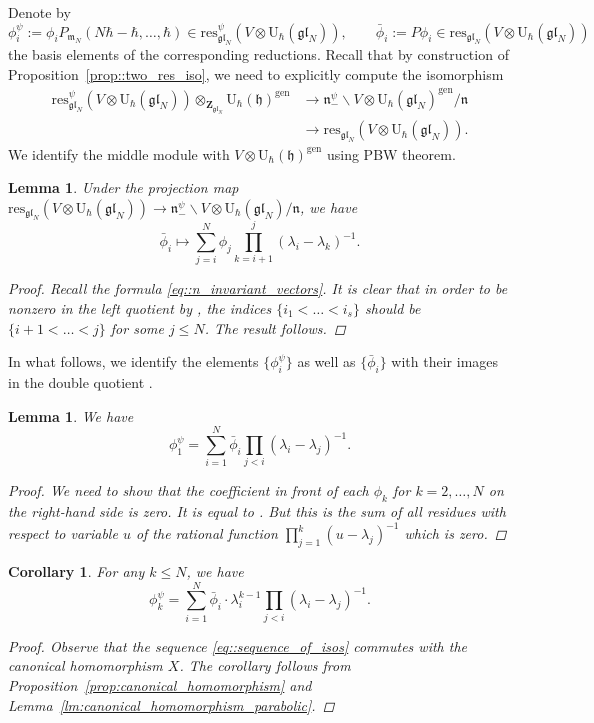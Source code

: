 \documentclass[10pt,a4paper]{article}
\numberwithin{equation}{section}
\newtheorem{Corollary}[Theorem]{Corollary}
\newtheorem{Lemma}[Theorem]{Lemma}
\newcommand{\U}{\mathrm{U}_{\hbar}}
\newcommand{\Z}{\mathbf{Z}}
\newcommand{\h}{\mathfrak{h}}
\newcommand{\n}{\mathfrak{n}}
\newcommand{\m}{\mathfrak{m}}
\newcommand{\gen}{\mathrm{gen}}
\newcommand{\res}{\mathrm{res}}
\newcommand{\gl}{\mathfrak{gl}}
\begin{document}
	Denote by
	\[
	\phi_i^{\psi} := \phi_i P_{\m_N}(N\hbar-\hbar,\dots,\hbar) \in \res^{\psi}_{\gl_N}(V \otimes \U(\gl_N)), \qquad \bar{\phi}_i := P \phi_i \in \res_{\gl_N}(V \otimes \U(\gl_N))
	\]
	the basis elements of the corresponding reductions. Recall that by construction of Proposition~\ref{prop::two_res_iso}, we need to explicitly compute the isomorphism
	\begin{align}
		\res^{\psi}_{\gl_N}(V \otimes \U(\gl_N)) \otimes_{\Z_{\gl_N}} \U(\h)^{\gen}& \rightarrow \n_-^{\psi} \backslash V \otimes \U(\gl_N)^{\gen} / \n\nonumber \\
&\rightarrow \res_{\gl_N}(V \otimes \U(\gl_N)).\label{eq::sequence_of_isos}
	\end{align}
	We identify the middle module with $V \otimes \U(\h)^{\gen}$ using PBW theorem.
	
	\begin{Lemma}
		Under the projection map $\res_{\gl_N}(V \otimes \U(\gl_N)) \rightarrow \n_-^{\psi} \backslash V \otimes \U(\gl_N) / \n$, we have
		\[
		\bar{\phi}_i \mapsto \sum\limits_{j=i}^{N} \phi_j \prod_{k=i+1}^j (\lambda_i-\lambda_k)^{-1}.
		\]
		\begin{proof}
			Recall the formula \eqref{eq::n_invariant_vectors}. It is clear that in order to be nonzero in the left quotient by \smash{$\n_-^{\psi}$}, the indices $\{i_1 < \dots < i_s\}$ should be $\{i+1 < \dots < j\}$ for some $j \leq N$. The result follows.
		\end{proof}
	\end{Lemma}
	
	In what follows, we identify the elements $\bigl\{\phi_i^{\psi}\bigr\}$ as well as $\bigl\{\bar{\phi}_i\bigr\}$ with their images in the double quotient \smash{$\n_-^{\psi} \backslash V \otimes \U(\gl_N) /\n$}.
	
	\begin{Lemma}
		We have
		\[
		\phi_1^{\psi} = \sum\limits_{i=1}^N \bar{\phi}_i \prod_{j<i} (\lambda_i - \lambda_j)^{-1}.
		\]
		\begin{proof}
			We need to show that the coefficient in front of each $\phi_k$ for $k=2,\dots,N$ on the right-hand side is zero. It is equal to . But this is the sum of all residues with respect to variable $u$ of the rational function $\prod_{j=1}^k (u-\lambda_j)^{-1}$ which is zero.
		\end{proof}
	\end{Lemma}
	
	\begin{Corollary}
		For any $k\leq N$, we have
		\[
		\phi_k^{\psi} = \sum\limits_{i=1}^N \bar{\phi}_i \cdot \lambda_i^{k-1} \prod_{j<i} (\lambda_i - \lambda_j)^{-1}.
		\]
		\begin{proof}
			Observe that the sequence \eqref{eq::sequence_of_isos} commutes with the canonical homomorphism $X$. The corollary follows from Proposition~\ref{prop:canonical_homomorphism} and Lemma~\ref{lm:canonical_homomorphism_parabolic}.
		\end{proof}
	\end{Corollary}
	
\end{document}
